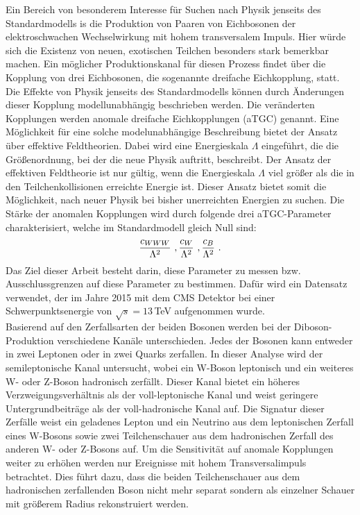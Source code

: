 Ein Bereich von besonderem Interesse für Suchen nach Physik jenseits des Standardmodells is die Produktion von Paaren von Eichbosonen der elektroschwachen Wechselwirkung mit hohem transversalem Impuls. Hier würde sich die Existenz von neuen, exotischen Teilchen besonders stark bemerkbar machen. Ein möglicher Produktionskanal für diesen Prozess findet über die Kopplung von drei Eichbosonen, die sogenannte dreifache Eichkopplung, statt. Die Effekte von Physik jenseits des Standardmodells können durch Änderungen dieser Kopplung modellunabhängig beschrieben werden. Die veränderten Kopplungen werden anomale dreifache Eichkopplungen (aTGC) genannt. Eine Möglichkeit für eine solche modelunabhängige Beschreibung bietet der Ansatz über effektive Feldtheorien. Dabei wird eine Energieskala $\Lambda$ eingeführt, die die Größenordnung, bei der die neue Physik auftritt, beschreibt. Der Ansatz der effektiven Feldtheorie ist nur gültig, wenn die Energieskala $\Lambda$ viel größer als die in den Teilchenkollisionen erreichte Energie ist. Dieser Ansatz bietet somit die Möglichkeit, nach neuer Physik bei bisher unerreichten Energien zu suchen. Die Stärke der anomalen Kopplungen wird durch folgende drei aTGC-Parameter charakterisiert, welche im Standardmodell gleich Null sind:
\begin{equation*}
\frac{c_{WWW}}{\Lambda^2} \ , \frac{c_{W}}{\Lambda^2} \ , \frac{c_{B}}{\Lambda^2} \ .
\end{equation*}
Das Ziel dieser Arbeit besteht darin, diese Parameter zu messen bzw. Ausschlussgrenzen auf diese Parameter zu bestimmen. Dafür wird ein Datensatz verwendet, der im Jahre 2015 mit dem CMS Detektor bei einer Schwerpunktsenergie von $\sqrt{s}=13$\,TeV aufgenommen wurde.\\

Basierend auf den Zerfallsarten der beiden Bosonen werden bei der Diboson-Produktion verschiedene Kanäle unterschieden. Jedes der Bosonen kann entweder in zwei Leptonen oder in zwei Quarks zerfallen. In dieser Analyse wird der semileptonische Kanal untersucht, wobei ein W-Boson leptonisch und ein weiteres W- oder Z-Boson hadronisch zerfällt. Dieser Kanal bietet ein höheres Verzweigungsverhältnis als der voll-leptonische Kanal und weist geringere Untergrundbeiträge als der voll-hadronische Kanal auf. Die Signatur dieser Zerfälle weist ein geladenes Lepton und ein Neutrino aus dem leptonischen Zerfall eines W-Bosons sowie zwei Teilchenschauer aus dem hadronischen Zerfall des anderen W- oder Z-Bosons auf. Um die Sensitivität auf anomale Kopplungen weiter zu erhöhen werden nur Ereignisse mit hohem Transversalimpuls betrachtet. Dies führt dazu, dass die beiden Teilchenschauer aus dem hadronischen zerfallenden Boson nicht mehr separat sondern als einzelner Schauer mit größerem Radius rekonstruiert werden.\\

